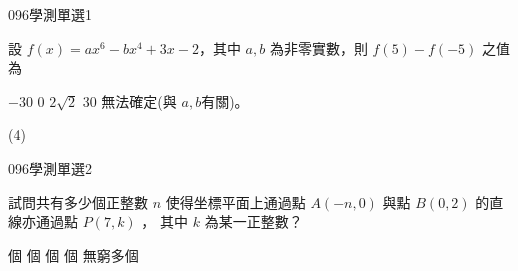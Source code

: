 \begin{QUESTIONS}
    \begin{QUESTION}
        \begin{ExamInfo}{096}{學測}{單選}{1}
        \end{ExamInfo}
        \begin{ExamAnsRateInfo}{71}{95}{81}{37}
        \end{ExamAnsRateInfo}
        \begin{QBODY}
		設 $f(x)=ax^6 -bx^4 +3x- 2$，其中 $a,b$ 為非零實數，則 $f(5)- f(-5)$ 之值為 
		\begin{QOPS} 
			\QOP $-30$        
			\QOP $0$        
			\QOP $2\sqrt{2}$ 
			\QOP $30$ 
			\QOP 無法確定(與 $a,b$有關)。
		\end{QOPS}
        \end{QBODY}
        \begin{QFROMS}
        \end{QFROMS}
        \begin{QTAGS}\end{QTAGS}
        \begin{QANS}
            (4)
        \end{QANS}
        \begin{QSOLLIST}
        \end{QSOLLIST}
        \begin{QEMPTYSPACE}
        \end{QEMPTYSPACE}
    \end{QUESTION}
    \begin{QUESTION}
        \begin{ExamInfo}{096}{學測}{單選}{2}
        \end{ExamInfo}
        \begin{ExamAnsRateInfo}{35}{58}{28}{19}
        \end{ExamAnsRateInfo}
        \begin{QBODY}
			試問共有多少個正整數 $n$ 使得坐標平面上通過點 $A(-n, 0)$ 與點 $B(0, 2)$ 的直線亦通過點 $P(7, k)$ ， 其中 $k$ 為某一正整數？
			\begin{QOPS} 
				\QOP 2 個 
				\QOP 4 個 
				\QOP 6 個 
				\QOP 8 個 
				\QOP 無窮多個
			\end{QOPS}
        \end{QBODY}
        \begin{QFROMS}
        \end{QFROMS}
        \begin{QTAGS}\end{QTAGS}

\end{QUESTION}
\end{QUESTIONS}
